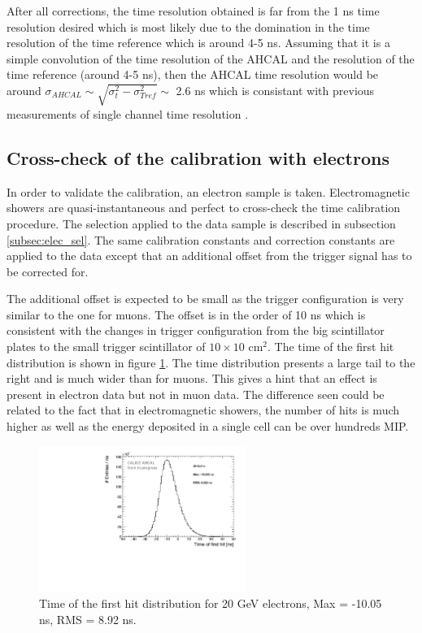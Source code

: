 After all corrections, the time resolution obtained is far from the 1 ns time resolution desired which is most likely due to the domination in the time resolution of the time reference which is around 4-5 ns. Assuming that it is a simple convolution of the time resolution of the AHCAL and the resolution of the time reference (around 4-5 ns), then the AHCAL time resolution would be around $\sigma_{AHCAL} \sim \sqrt{\sigma_{t}^2 - \sigma_{Tref}^2} \sim$ 2.6 ns which is consistant with previous measurements of single channel time resolution \cite{Laurien2016}.

\subsection{Cross-check of the calibration with electrons}
\label{subsec:validation}

In order to validate the calibration, an electron sample is taken. Electromagnetic showers are quasi-instantaneous and perfect to cross-check the time calibration procedure. The selection applied to the data sample is described in subsection \ref{subsec:elec_sel}. The same calibration constants and correction constants are applied to the data except that an additional offset from the trigger signal has to be corrected for.

The additional offset is expected to be small as the trigger configuration is very similar to the one for muons. The offset is in the order of 10 ns which is consistent with the changes in trigger configuration from the big scintillator plates to the small trigger scintillator of $10\times10$ cm$^2$. The time of the first hit distribution is shown in figure \ref{fig:Timing_electrons}. The time distribution presents a large tail to the right and is much wider than for muons. This gives a hint that an effect is present in electron data but not in muon data. The difference seen could be related to the fact that in electromagnetic showers, the number of hits is much higher as well as the energy deposited in a single cell can be over hundreds MIP.

\begin{figure}[htbp!]
	\centering
	\includegraphics[width=0.6\textwidth]{chap5/fig_AHCAL_timing/Electrons/Timing_AllLayers_AfterMuons.pdf}
	\caption{Time of the first hit distribution for 20 GeV electrons, Max = -10.05 ns, RMS = 8.92 ns.}
	\label{fig:Timing_electrons}
\end{figure}

